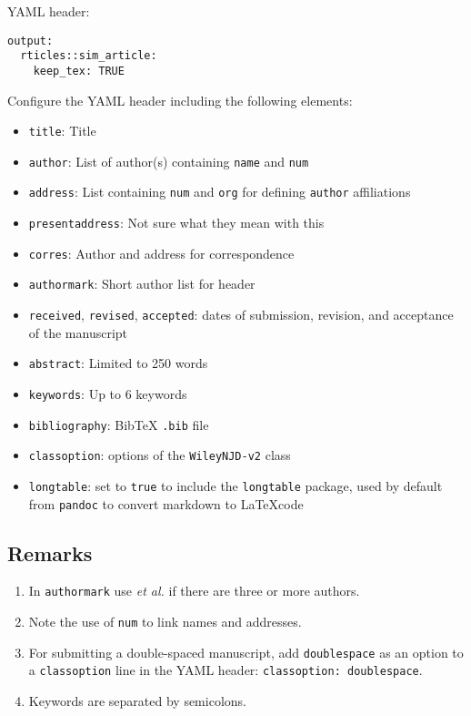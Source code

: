 \documentclass[AMA,STIX1COL,]{WileyNJD-v2}
\begin{document}
YAML header:

\begin{verbatim}
output:
  rticles::sim_article:
    keep_tex: TRUE
\end{verbatim}

Configure the YAML header including the following elements:

\begin{itemize}
\item
  \texttt{title}: Title
\item
  \texttt{author}: List of author(s) containing \texttt{name} and
  \texttt{num}
\item
  \texttt{address}: List containing \texttt{num} and \texttt{org} for
  defining \texttt{author} affiliations
\item
  \texttt{presentaddress}: Not sure what they mean with this
\item
  \texttt{corres}: Author and address for correspondence
\item
  \texttt{authormark}: Short author list for header
\item
  \texttt{received}, \texttt{revised}, \texttt{accepted}: dates of
  submission, revision, and acceptance of the manuscript
\item
  \texttt{abstract}: Limited to 250 words
\item
  \texttt{keywords}: Up to 6 keywords
\item
  \texttt{bibliography}: BibTeX \texttt{.bib} file
\item
  \texttt{classoption}: options of the \texttt{WileyNJD-v2} class
\item
  \texttt{longtable}: set to \texttt{true} to include the
  \texttt{longtable} package, used by default from \texttt{pandoc} to
  convert markdown to \LaTeX code
\end{itemize}

\subsection{Remarks}\label{remarks}

\begin{enumerate}
\def\labelenumi{\arabic{enumi}.}
\item
  In \texttt{authormark} use \emph{et al.} if there are three or more
  authors.
\item
  Note the use of \texttt{num} to link names and addresses.
\item
  For submitting a double-spaced manuscript, add \texttt{doublespace} as
  an option to a \texttt{classoption} line in the YAML header:
  \texttt{classoption:\ doublespace}.
\item
  Keywords are separated by semicolons.
\end{enumerate}
\end{document}
